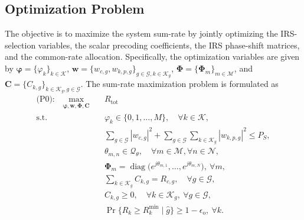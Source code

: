 \documentclass[12pt,onecolumn]{IEEEtran}
\begin{document}
\subsection{Optimization Problem}

The objective is to maximize the system sum-rate by jointly optimizing the IRS-selection variables, the scalar precoding coefficients, the IRS phase-shift matrices, and the common-rate allocation.
Specifically, the optimization variables are given by
$\boldsymbol{\varphi}=\{\varphi_k\}_{k\in\mathcal{K}}$, 
$\mathbf{w}=\{w_{c,g},w_{k,p,g}\}_{g\in\mathcal{G},k\in\mathcal{K}_g}$,
$\boldsymbol{\Phi}=\{\boldsymbol{\Phi}_m\}_{m\in\mathcal{M}}$, 
and $\mathbf{C}=\{C_{k,g}\}_{k\in\mathcal{K}_g,g\in\mathcal{G}}$. 
The sum-rate maximization problem is formulated as
\begin{subequations}\label{eq:P0}
\begin{align}
    \text{(P0):} \quad
    \max_{\boldsymbol{\varphi},\mathbf{w},\boldsymbol{\Phi},\mathbf{C}}
    \quad
    &
    R_{\mathrm{tot}}
    \label{eq:P0_objective}
    \\
    \text{s.t.}\;
    &
    \varphi_k \in \{0,1,\ldots,M\},
    \quad \forall k \in \mathcal{K},
    \label{eq:P0_selection}
    \\[1mm]
    &
    \sum_{g \in \mathcal{G}} |w_{c,g}|^2
    +
    \sum_{g \in \mathcal{G}}\sum_{k \in \mathcal{K}_g} |w_{k,p,g}|^2
    \leq P_S,
    \label{eq:P0_power}
    \\[1mm]
    &
    \theta_{m,n} \in \mathcal{Q}_{\theta},
    \quad \forall m \in \mathcal{M}, \forall n \in \mathcal{N},
    \label{eq:P0_phase}
    \\[1mm]
    &
    \boldsymbol{\Phi}_m
    =
    \operatorname{diag}
    \bigl(
    e^{j\theta_{m,1}},
    \ldots,
    e^{j\theta_{m,N}}
    \bigr),
    \ \forall m,
    \label{eq:P0_phi}
    \\[1mm]
    &
    \sum_{k \in \mathcal{K}_g} C_{k,g}
    = R_{c,g},
    \quad \forall g \in \mathcal{G},
    \label{eq:P0_common_rate}
    \\[1mm]
    &
    C_{k,g} \geq 0,
    \quad \forall k \in \mathcal{K}_g,\ \forall g \in \mathcal{G},
    \label{eq:P0_nonnegative}
    \\[1mm]
    &
    \Pr\{ R_k \geq R_k^{\min} \mid \hat{g} \} \geq 1-\epsilon_{\mathrm{o}},
    \ \forall k.
    \label{eq:P0_qos}
\end{align}
\end{subequations}
\end{document}

